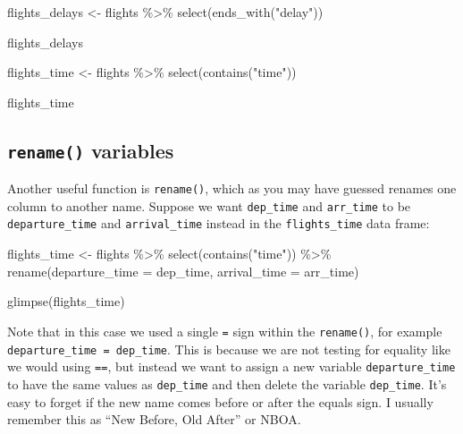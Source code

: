 \documentclass[
  letterpaper,
  DIV=11,
  numbers=noendperiod]{scrreprt}
\newenvironment{Shaded}{\begin{snugshade}}{\end{snugshade}}
\newcommand{\AttributeTok}[1]{\textcolor[rgb]{0.40,0.45,0.13}{#1}}
\newcommand{\FunctionTok}[1]{\textcolor[rgb]{0.28,0.35,0.67}{#1}}
\newcommand{\NormalTok}[1]{\textcolor[rgb]{0.00,0.23,0.31}{#1}}
\newcommand{\OtherTok}[1]{\textcolor[rgb]{0.00,0.23,0.31}{#1}}
\newcommand{\SpecialCharTok}[1]{\textcolor[rgb]{0.37,0.37,0.37}{#1}}
\newcommand{\StringTok}[1]{\textcolor[rgb]{0.13,0.47,0.30}{#1}}
\theoremstyle{definition}
\theoremstyle{remark}
\begin{document}
\begin{Shaded}
\begin{Highlighting}[]
\NormalTok{flights\_delays }\OtherTok{\textless{}{-}}\NormalTok{ flights }\SpecialCharTok{\%\textgreater{}\%} 
  \FunctionTok{select}\NormalTok{(}\FunctionTok{ends\_with}\NormalTok{(}\StringTok{"delay"}\NormalTok{))}

\NormalTok{flights\_delays}
\end{Highlighting}
\end{Shaded}

\begin{Shaded}
\begin{Highlighting}[]
\NormalTok{flights\_time }\OtherTok{\textless{}{-}}\NormalTok{ flights }\SpecialCharTok{\%\textgreater{}\%} 
  \FunctionTok{select}\NormalTok{(}\FunctionTok{contains}\NormalTok{(}\StringTok{"time"}\NormalTok{))}

\NormalTok{flights\_time}
\end{Highlighting}
\end{Shaded}

\hypertarget{sec-rename}{%
\subsection{\texorpdfstring{\texttt{rename()}
variables}{rename() variables}}\label{sec-rename}}

Another useful function is \texttt{rename()}, which as you may have
guessed renames one column to another name. Suppose we want
\texttt{dep\_time} and \texttt{arr\_time} to be \texttt{departure\_time}
and \texttt{arrival\_time} instead in the \texttt{flights\_time} data
frame:

\begin{Shaded}
\begin{Highlighting}[]
\NormalTok{flights\_time }\OtherTok{\textless{}{-}}\NormalTok{ flights }\SpecialCharTok{\%\textgreater{}\%} 
  \FunctionTok{select}\NormalTok{(}\FunctionTok{contains}\NormalTok{(}\StringTok{"time"}\NormalTok{)) }\SpecialCharTok{\%\textgreater{}\%} 
  \FunctionTok{rename}\NormalTok{(}\AttributeTok{departure\_time =}\NormalTok{ dep\_time,}
         \AttributeTok{arrival\_time =}\NormalTok{ arr\_time)}

\FunctionTok{glimpse}\NormalTok{(flights\_time)}
\end{Highlighting}
\end{Shaded}

Note that in this case we used a single \texttt{=} sign within the
\texttt{rename()}, for example \texttt{departure\_time\ =\ dep\_time}.
This is because we are not testing for equality like we would using
\texttt{==}, but instead we want to assign a new variable
\texttt{departure\_time} to have the same values as \texttt{dep\_time}
and then delete the variable \texttt{dep\_time}. It's easy to forget if
the new name comes before or after the equals sign. I usually remember
this as ``New Before, Old After'' or NBOA.
\end{document}

